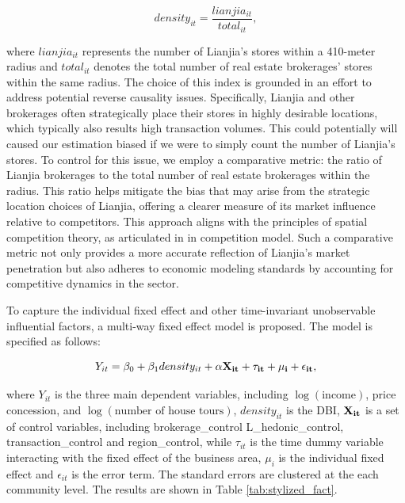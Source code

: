 \documentclass[11pt]{article}
\begin{document}
\begin{equation*}
  density_{it} = \frac{lianjia_{it}}{total_{it}},
\end{equation*}

where $lianjia_{it}$ represents the number of Lianjia's stores within a 410-meter radius and $total_{it}$ denotes the total number of real estate brokerages' stores within the same radius. The choice of this index is grounded in an effort to address potential reverse causality issues. Specifically, Lianjia and other brokerages often strategically place their stores in highly desirable locations, which typically also results high transaction volumes. This could potentially will caused our estimation biased if we were to simply count the number of Lianjia's stores. To control for this issue, we employ a comparative metric: the ratio of Lianjia brokerages to the total number of real estate brokerages within the radius. This ratio helps mitigate the bias that may arise from the strategic location choices of Lianjia, offering a clearer measure of its market influence relative to competitors. This approach aligns with the principles of spatial competition theory, as articulated in \citep{hotelling_stability_1929, daspremont_hotellings_1979} in competition model. Such a comparative metric not only provides a more accurate reflection of Lianjia's market penetration but also adheres to economic modeling standards by accounting for competitive dynamics in the sector.

To capture the individual fixed effect and other time-invariant unobservable influential factors, a multi-way fixed effect model is proposed. The model is specified as follows: 

\begin{equation}
  Y_{it} = \beta_0 + \beta_1 density_{it} + \bf{\alpha} \bf{X}_{it} + \tau_{it} + \mu_i + \epsilon_{it}, \label{eq:multi-way-fe}
\end{equation}

where $Y_{it}$ is the three main dependent variables, including $\log(\text{income})$, price concession, and $\log(\text{number of house tours})$, $density_{it}$ is the DBI, $\bf{X}_{it}$ is a set of control variables, including brokerage\_control L\_hedonic\_control, transaction\_control and region\_control, while $\tau_{it}$ is the time dummy variable interacting with the fixed effect of the business area, $\mu_i$ is the individual fixed effect and $\epsilon_{it}$ is the error term. The standard errors are clustered at the each community level. The results are shown in Table \ref{tab:stylized_fact}.
\end{document}
